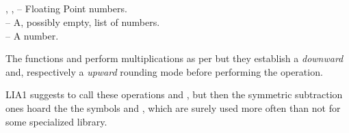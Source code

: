 \documentclass[../Arithmetic-Operations.tex]{subfiles}
\begin{document}


   \RArrow {}\\
   \RArrow {}\\
   \RArrow \varname {}\\
   \RArrow \varname {}\\

\DArgsNValues{}

, ,  -- Floating Point numbers.\\
 -- A, possibly empty, list of numbers.\\
 -- A number.

\DDescription{}

The functions   and  perform multiplications as per \code{*}
but they establish a \emph{downward} and, respectively a
\emph{upward} rounding mode before performing the operation.

\DNotes{}

LIA1 suggests to call these operations \code{<*} and \code{*>}, but
then the symmetric subtraction ones hoard the the symbols \code{<-}
and \code{->}, which are surely used more often than not for some
specialized library.
\end{document}
